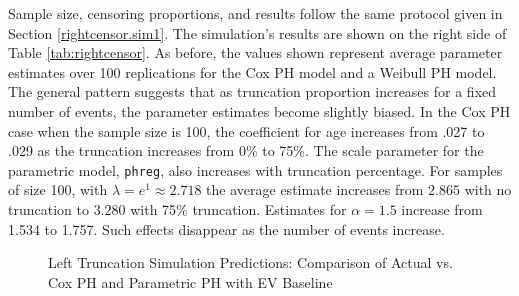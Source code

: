 Sample size, censoring proportions, and results follow the same protocol given in Section \ref{rightcensor.sim1}. The simulation's results are shown on the right side of Table \ref{tab:rightcensor}.  As before, the values shown represent average parameter estimates over 100 replications for the Cox PH model and a Weibull PH model. The general pattern suggests that as truncation proportion increases for a fixed number of events, the parameter estimates become slightly biased.  In the Cox PH case when the sample size is 100, the coefficient for age increases from .027 to .029 as the truncation increases from 0\% to 75\%. The scale parameter for the parametric model, {\tt phreg}, also increases with truncation percentage.  For samples of size 100, with $\lambda = e^1 \approx 2.718$ the average estimate increases from $2.865$ with no truncation to $3.280$ with 75\% truncation.  Estimates for $\alpha = 1.5$ increase from 1.534 to 1.757. Such effects disappear as the number of events increase.
\begin{figure}[h!]
	\centering
	\quad
	\quad
	\quad
	\caption{Left Truncation Simulation Predictions: Comparison of Actual vs. Cox PH and Parametric PH with EV Baseline}
	\label{fig:leftbase}
\end{figure}

